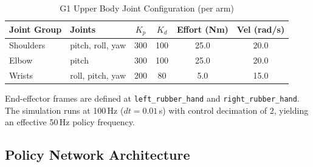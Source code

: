 \documentclass[11pt,a4paper]{article}
\begin{document}
\begin{table}[H]
\centering
\caption{G1 Upper Body Joint Configuration (per arm)}
\label{tab:joint_config}
\begin{tabular}{@{}llcccc@{}}
\toprule
\textbf{Joint Group} & \textbf{Joints} & \textbf{$K_p$} & \textbf{$K_d$} & \textbf{Effort (Nm)} & \textbf{Vel (rad/s)} \\
\midrule
Shoulders & pitch, roll, yaw & 300 & 100 & 25.0 & 20.0 \\
Elbow & pitch & 300 & 100 & 25.0 & 20.0 \\
Wrists & roll, pitch, yaw & 200 & 80 & 5.0 & 15.0 \\
\bottomrule
\end{tabular}
\end{table}

\noindent End-effector frames are defined at \texttt{left\_rubber\_hand} and \texttt{right\_rubber\_hand}. The simulation runs at 100\,Hz ($dt=0.01$\,s) with control decimation of 2, yielding an effective 50\,Hz policy frequency.

\subsection{Policy Network Architecture}
\end{document}
